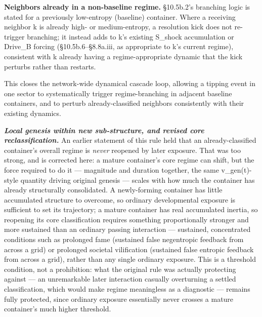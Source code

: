 \documentclass[
]{article}
\begin{document}
\textbf{Neighbors already in a non-baseline regime.} §10.5b.2's
branching logic is stated for a previously low-entropy (baseline)
container. Where a receiving neighbor k is already high- or
medium-entropy, a resolution kick does not re-trigger branching; it
instead adds to k's existing S\_shock accumulation or Drive\_B forcing
(§10.5b.6--§8.8a.iii, as appropriate to k's current regime), consistent
with k already having a regime-appropriate dynamic that the kick
perturbs rather than restarts.

This closes the network-wide dynamical cascade loop, allowing a tipping
event in one sector to systematically trigger regime-branching in
adjacent baseline containers, and to perturb already-classified
neighbors consistently with their existing dynamics.

\emph{\textbf{Local genesis within new sub-structure, and revised core
reclassification.}} An earlier statement of this rule held that an
already-classified container's overall regime is \emph{never} reopened
by later exposure. That was too strong, and is corrected here: a mature
container's core regime can shift, but the force required to do it ---
magnitude and duration together, the same v\_gen(t)-style quantity
driving original genesis --- scales with how much the container has
already structurally consolidated. A newly-forming container has little
accumulated structure to overcome, so ordinary developmental exposure is
sufficient to set its trajectory; a mature container has real
accumulated inertia, so reopening its core classification requires
something proportionally stronger and more sustained than an ordinary
passing interaction --- sustained, concentrated conditions such as
prolonged fame (sustained false negentropic feedback from across a grid)
or prolonged societal vilification (sustained false entropic feedback
from across a grid), rather than any single ordinary exposure. This is a
threshold condition, not a prohibition: what the original rule was
actually protecting against --- an unremarkable later interaction
casually overturning a settled classification, which would make regime
meaningless as a diagnostic --- remains fully protected, since ordinary
exposure essentially never crosses a mature container's much higher
threshold.
\end{document}
